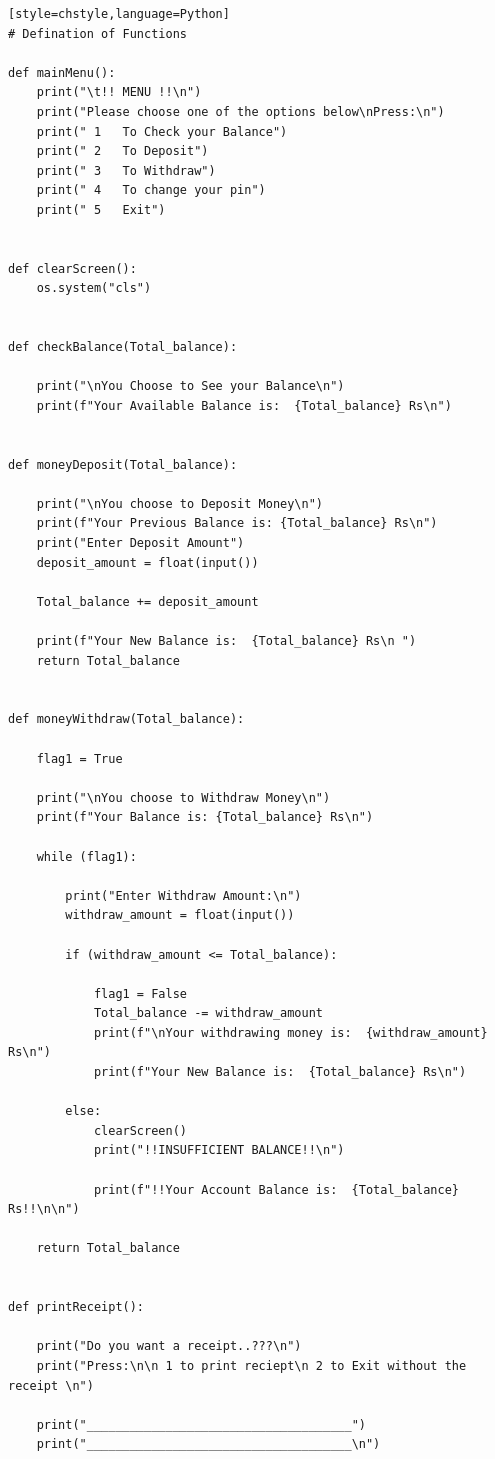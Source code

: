 \documentclass{article}
\begin{document}
\begin{verbatim}[style=chstyle,language=Python]
# Defination of Functions

def mainMenu():
    print("\t!! MENU !!\n")
    print("Please choose one of the options below\nPress:\n")
    print(" 1   To Check your Balance")
    print(" 2   To Deposit")
    print(" 3   To Withdraw")
    print(" 4   To change your pin")
    print(" 5   Exit")


def clearScreen():
    os.system("cls")


def checkBalance(Total_balance):

    print("\nYou Choose to See your Balance\n")
    print(f"Your Available Balance is:  {Total_balance} Rs\n")


def moneyDeposit(Total_balance):

    print("\nYou choose to Deposit Money\n")
    print(f"Your Previous Balance is: {Total_balance} Rs\n")
    print("Enter Deposit Amount")
    deposit_amount = float(input())

    Total_balance += deposit_amount

    print(f"Your New Balance is:  {Total_balance} Rs\n ")
    return Total_balance


def moneyWithdraw(Total_balance):

    flag1 = True

    print("\nYou choose to Withdraw Money\n")
    print(f"Your Balance is: {Total_balance} Rs\n")

    while (flag1):

        print("Enter Withdraw Amount:\n")
        withdraw_amount = float(input())

        if (withdraw_amount <= Total_balance):

            flag1 = False
            Total_balance -= withdraw_amount
            print(f"\nYour withdrawing money is:  {withdraw_amount} Rs\n")
            print(f"Your New Balance is:  {Total_balance} Rs\n")

        else:
            clearScreen()
            print("!!INSUFFICIENT BALANCE!!\n")

            print(f"!!Your Account Balance is:  {Total_balance} Rs!!\n\n")

    return Total_balance


def printReceipt():

    print("Do you want a receipt..???\n")
    print("Press:\n\n 1 to print reciept\n 2 to Exit without the receipt \n")

    print("_____________________________________")
    print("_____________________________________\n")


\end{verbatim}
\end{document}
